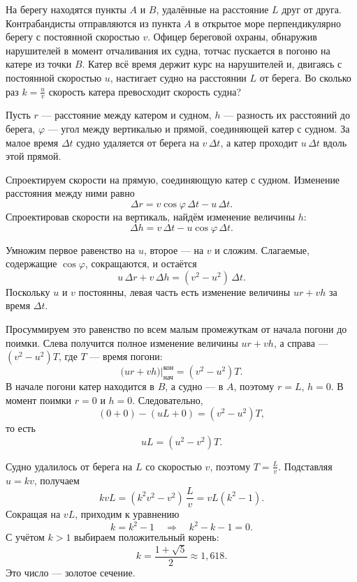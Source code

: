 \documentclass[../main.tex]{subfiles}
\begin{document}
\begin{example}
На берегу находятся пункты $A$ и $B$, удалённые на расстояние $L$ друг от
друга. Контрабандисты отправляются из пункта $A$ в открытое море
перпендикулярно берегу с постоянной скоростью $v$. Офицер береговой охраны,
обнаружив нарушителей в момент отчаливания их судна, тотчас пускается
в погоню на катере из точки $B$. Катер всё время держит курс на
нарушителей и, двигаясь с постоянной скоростью $u$, настигает судно на
расстоянии $L$ от берега. Во сколько раз $k = \frac{u}{v}$ скорость катера
превосходит скорость судна?

Пусть $r$ --- расстояние между катером и судном, $h$ --- разность их
расстояний до берега, $\varphi$ --- угол между вертикалью и прямой,
соединяющей катер с судном. За малое время $\Delta t$ судно удаляется
от берега на $v\,\Delta t$, а катер проходит $u\,\Delta t$ вдоль этой
прямой.

Спроектируем скорости на прямую, соединяющую катер с судном. Изменение
расстояния между ними равно
\[
\Delta r = v\cos\varphi\,\Delta t - u\,\Delta t.
\]
Спроектировав скорости на вертикаль, найдём изменение величины $h$:
\[
\Delta h = v\,\Delta t - u\cos\varphi\,\Delta t.
\]

Умножим первое равенство на $u$, второе --- на $v$ и сложим. Слагаемые,
содержащие $\cos\varphi$, сокращаются, и остаётся
\[
u\,\Delta r + v\,\Delta h = (v^2 - u^2)\,\Delta t.
\]
Поскольку $u$ и $v$ постоянны, левая часть есть изменение величины
$ur + vh$ за время $\Delta t$.

Просуммируем это равенство по всем малым промежуткам от начала погони
до поимки. Слева получится полное изменение величины $ur + vh$, а справа
--- $(v^2 - u^2)T$, где $T$ --- время погони:
\[
\bigl(ur + vh\bigr)\Big|_{\text{нач}}^{\text{кон}} = (v^2 - u^2)T.
\]
В начале погони катер находится в $B$, а судно --- в $A$, поэтому
$r = L$, $h = 0$. В момент поимки $r = 0$ и $h = 0$. Следовательно,
\[
(0 + 0) - (uL + 0) = (v^2 - u^2)T,
\]
то есть
\[
uL = (u^2 - v^2)T.
\]

Судно удалилось от берега на $L$ со скоростью $v$, поэтому $T = \frac{L}{v}$.
Подставляя $u = kv$, получаем
\[
kvL = (k^2v^2 - v^2)\,\frac{L}{v} = vL(k^2 - 1).
\]
Сокращая на $vL$, приходим к уравнению
\[
k = k^2 - 1
\quad\Rightarrow\quad
k^2 - k - 1 = 0.
\]
С учётом $k > 1$ выбираем положительный корень:
\[
k = \frac{1 + \sqrt{5}}{2} \approx 1{,}618.
\]
Это число --- золотое сечение.
\end{example}
\end{document}

